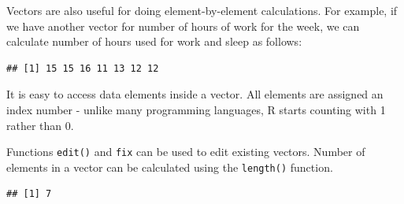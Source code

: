 \documentclass[11pt, letterpaper, twoside]{memoir}\usepackage{knitr}
\begin{document}
Vectors are also useful for doing element-by-element calculations. For example, if we have another vector for number of hours of work for the week, we can calculate number of hours used for work and sleep as follows:

\begin{knitrout}
\color{fgcolor}\begin{kframe}
\begin{alltt}
 \hlkwb{<-} \hlstd{(}\hlstd{,} \hlstd{,} \hlstd{,} \hlstd{,} \hlstd{,} \hlstd{,} \hlstd{)}  
 \hlkwb{<-}  \hlopt{+} 
  
\end{alltt}
\begin{verbatim}
## [1] 15 15 16 11 13 12 12
\end{verbatim}
\end{kframe}
\end{knitrout}

It is easy to access data elements inside a vector. All elements are assigned an index number - unlike many programming languages, R starts counting with 1 rather than 0. 

\begin{knitrout}
\color{fgcolor}\begin{kframe}
\begin{alltt}
 \hlkwb{<-} \hlstd{work.per.day[}\hlstd{]}  
\hlstd{work.per.day[}\hlstd{]} \hlkwb{<-}   
\end{alltt}
\end{kframe}
\end{knitrout}

Functions \texttt{edit()} and \texttt{fix} can be used to edit existing vectors. Number of elements in a vector can be calculated using the \texttt{length()} function.
\begin{knitrout}
\color{fgcolor}\begin{kframe}
\begin{alltt}
\end{alltt}
\begin{verbatim}
## [1] 7
\end{verbatim}
\end{kframe}
\end{knitrout}
\end{document}
